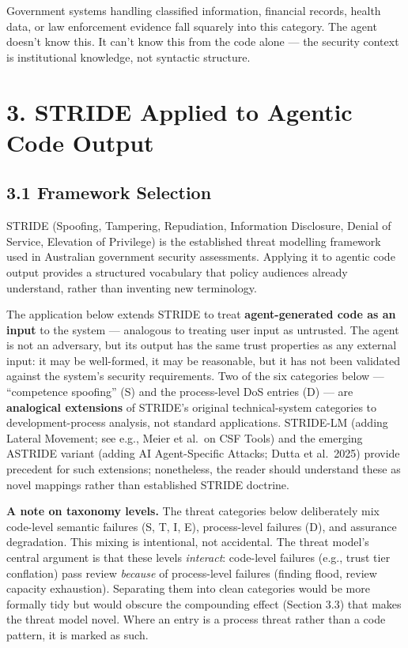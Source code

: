 \documentclass[a4paper,11pt]{report}
\begin{document}
Government systems handling classified information, financial records,
health data, or law enforcement evidence fall squarely into this
category. The agent doesn't know this. It can't know this from the code
alone --- the security context is institutional knowledge, not syntactic
structure.

\hypertarget{stride-applied-to-agentic-code-output}{%
\section{3. STRIDE Applied to Agentic Code
Output}\label{stride-applied-to-agentic-code-output}}

\hypertarget{framework-selection}{%
\subsection{3.1 Framework Selection}\label{framework-selection}}

STRIDE (Spoofing, Tampering, Repudiation, Information Disclosure, Denial
of Service, Elevation of Privilege) is the established threat modelling
framework used in Australian government security assessments. Applying
it to agentic code output provides a structured vocabulary that policy
audiences already understand, rather than inventing new terminology.

The application below extends STRIDE to treat \textbf{agent-generated
code as an input} to the system --- analogous to treating user input as
untrusted. The agent is not an adversary, but its output has the same
trust properties as any external input: it may be well-formed, it may be
reasonable, but it has not been validated against the system's security
requirements. Two of the six categories below --- ``competence
spoofing'' (S) and the process-level DoS entries (D) --- are
\textbf{analogical extensions} of STRIDE's original technical-system
categories to development-process analysis, not standard applications.
STRIDE-LM (adding Lateral Movement; see e.g., Meier et al.~on CSF Tools)
and the emerging ASTRIDE variant (adding AI Agent-Specific Attacks;
Dutta et al.~2025) provide precedent for such extensions; nonetheless,
the reader should understand these as novel mappings rather than
established STRIDE doctrine.

\textbf{A note on taxonomy levels.} The threat categories below
deliberately mix code-level semantic failures (S, T, I, E),
process-level failures (D), and assurance degradation. This mixing is
intentional, not accidental. The threat model's central argument is that
these levels \emph{interact}: code-level failures (e.g., trust tier
conflation) pass review \emph{because} of process-level failures
(finding flood, review capacity exhaustion). Separating them into clean
categories would be more formally tidy but would obscure the compounding
effect (Section 3.3) that makes the threat model novel. Where an entry
is a process threat rather than a code pattern, it is marked as such.
\end{document}
